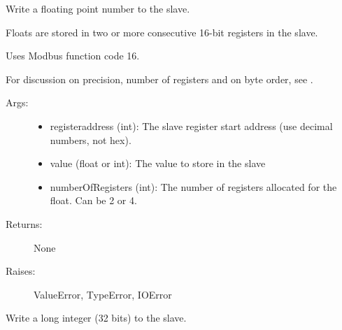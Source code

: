 \documentclass[letterpaper,10pt,english]{sphinxmanual}
\begin{document}
\begin{fulllineitems}
\begin{fulllineitems}
\begin{description}
\end{description}

\end{fulllineitems}


\begin{fulllineitems}
\label{minimalmodbus:minimalmodbus.Instrument.write_float}
Write a floating point number to the slave.

Floats are stored in two or more consecutive 16-bit registers in the slave.

Uses Modbus function code 16.

For discussion on precision, number of registers and on byte order, see {\hyperref[minimalmodbus:minimalmodbus.Instrument.read_float]{}}.
\begin{description}
\item[{Args:}] \leavevmode\begin{itemize}
\item {} 
registeraddress (int): The slave register start address (use decimal numbers, not hex).

\item {} 
value (float or int): The value to store in the slave

\item {} 
numberOfRegisters (int): The number of registers allocated for the float. Can be 2 or 4.

\end{itemize}

\item[{Returns:}] \leavevmode
None

\item[{Raises:}] \leavevmode
ValueError, TypeError, IOError

\end{description}

\end{fulllineitems}


\begin{fulllineitems}
\label{minimalmodbus:minimalmodbus.Instrument.write_long}
Write a long integer (32 bits) to the slave.


\end{fulllineitems}
\end{fulllineitems}
\end{document}

